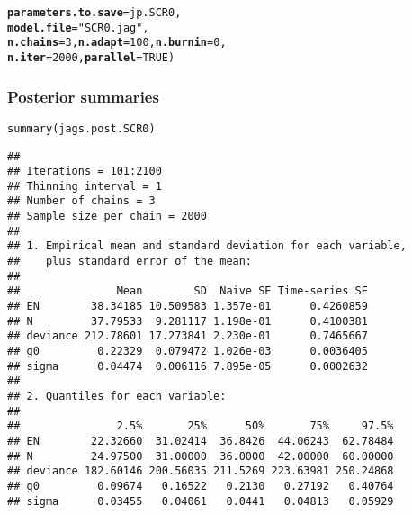 \documentclass[color=usenames,dvipsnames]{beamer}\usepackage[]{graphicx}\usepackage[]{xcolor}
\makeatletter
\newcommand{\hlnum}[1]{\textcolor[rgb]{0.69,0.494,0}{#1}}%
\newcommand{\hlsng}[1]{\textcolor[rgb]{0.749,0.012,0.012}{#1}}%
\newcommand{\hldef}[1]{\textcolor[rgb]{0,0,0}{#1}}%
\newcommand{\hlkwc}[1]{\textcolor[rgb]{0,0,0}{\textbf{#1}}}%
\newcommand{\hlkwd}[1]{\textcolor[rgb]{0.004,0.004,0.506}{#1}}%
\newenvironment{kframe}{%
 \def\at@end@of@kframe{}%
 \ifinner\ifhmode%
  \def\at@end@of@kframe{\end{minipage}}%
  \begin{minipage}{\columnwidth}%
 \fi\fi%
 \def\FrameCommand##1{\hskip\@totalleftmargin \hskip-\fboxsep
 \colorbox{shadecolor}{##1}\hskip-\fboxsep
     \hskip-\linewidth \hskip-\@totalleftmargin \hskip\columnwidth}%
 \MakeFramed {\advance\hsize-\width
   \@totalleftmargin\z@ \linewidth\hsize
   \@setminipage}}%
 {\par\unskip\endMakeFramed%
 \at@end@of@kframe}
\newenvironment{knitrout}{}{} %
\makeatother
\begin{document}
\begin{frame}[fragile]
\begin{knitrout}
\begin{kframe}
\begin{alltt}
                             \hlkwc{parameters.to.save}\hldef{=jp.SCR0,}
                             \hlkwc{model.file}\hldef{=}\hlsng{"SCR0.jag"}\hldef{,}
                             \hlkwc{n.chains}\hldef{=}\hlnum{3}\hldef{,} \hlkwc{n.adapt}\hldef{=}\hlnum{100}\hldef{,} \hlkwc{n.burnin}\hldef{=}\hlnum{0}\hldef{,}
                             \hlkwc{n.iter}\hldef{=}\hlnum{2000}\hldef{,} \hlkwc{parallel}\hldef{=}\hlnum{TRUE}\hldef{)}
\end{alltt}
\end{kframe}
\end{knitrout}
\end{frame}




\begin{frame}[fragile]
  \frametitle{Posterior summaries}
\begin{knitrout}\tiny
{}\color{fgcolor}\begin{kframe}
\begin{alltt}
\hlkwd{summary}\hldef{(jags.post.SCR0)}
\end{alltt}
\begin{verbatim}
## 
## Iterations = 101:2100
## Thinning interval = 1 
## Number of chains = 3 
## Sample size per chain = 2000 
## 
## 1. Empirical mean and standard deviation for each variable,
##    plus standard error of the mean:
## 
##               Mean        SD  Naive SE Time-series SE
## EN        38.34185 10.509583 1.357e-01      0.4260859
## N         37.79533  9.281117 1.198e-01      0.4100381
## deviance 212.78601 17.273841 2.230e-01      0.7465667
## g0         0.22329  0.079472 1.026e-03      0.0036405
## sigma      0.04474  0.006116 7.895e-05      0.0002632
## 
## 2. Quantiles for each variable:
## 
##               2.5%       25%      50%       75%     97.5%
## EN        22.32660  31.02414  36.8426  44.06243  62.78484
## N         24.97500  31.00000  36.0000  42.00000  60.00000
## deviance 182.60146 200.56035 211.5269 223.63981 250.24868
## g0         0.09674   0.16522   0.2130   0.27192   0.40764
## sigma      0.03455   0.04061   0.0441   0.04813   0.05929
\end{verbatim}
\end{kframe}
\end{knitrout}
\end{frame}
\end{document}
